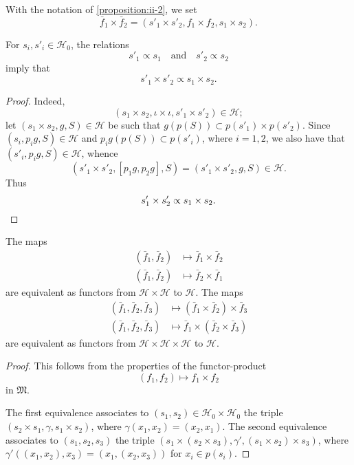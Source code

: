 \documentclass[a4paper,fleqn]{article}
\theoremstyle{plain}
\newenvironment{proposition}[1]
  {\renewcommand\theinnerproposition{#1}\innerproposition}
  {\endinnerproposition}
\theoremstyle{definition}
\newcommand{\textand}{\quad\text{and}\quad}
\newcommand{\HH}{\mathcal{H}}
\newcommand{\MM}{\mathfrak{M}}
\newcommand{\subs}{\mathrel{\propto}}
\begin{document}
With the notation of \cref{proposition:ii-2}, we set
\[
  \bar{f}_1\times\bar{f}_2
  = (s'_1\times s'_2, f_1\times f_2, s_1\times s_2).
\]

\begin{proposition}{3}
\label{proposition:ii-3}
  For $s_i,s'_i\in\HH_0$, the relations
  \[
    s'_1\subs s_1
    \textand
    s'_2\subs s_2
  \]
  imply that
  \[
    s'_1\times s'_2
    \subs s_1\times s_2.
  \]
\end{proposition}

\begin{proof}
  Indeed,
  \[
    (s_1\times s_2, \iota\times\iota, s'_1\times s'_2)
    \in\HH;
  \]
  let $(s_1\times s_2,g,S)\in\HH$ be such that $g(p(S))\subset p(s'_1)\times p(s'_2)$.
  Since $(s_i,p_ig,S)\in\HH$ and $p_ig(p(S))\subset p(s'_i)$, where $i=1,2$, we also have that $(s'_i,p_ig,S)\in\HH$, whence
  \[
    (s'_1\times s'_2, [p_1g,p_2g], S)
    = (s'_1\times s'_2,g,S)
    \in\HH.
  \]
  Thus
  \[
    s'_1\times s'_2
    \subs s_1\times s_2.
    \qedhere
  \]
\end{proof}

\begin{proposition}{4}
\label{proposition:ii-4}
  The maps
  \[
    \begin{aligned}
      (\bar{f}_1,\bar{f}_2)
      &\longmapsto \bar{f}_1\times\bar{f}_2
    \\(\bar{f}_1,\bar{f}_2)
      &\longmapsto \bar{f}_2\times\bar{f}_1
    \end{aligned}
  \]
  are equivalent as functors from $\HH\times\HH$ to $\HH$.
  The maps
  \[
    \begin{aligned}
      (\bar{f}_1,\bar{f}_2,\bar{f}_3)
      &\longmapsto (\bar{f}_1\times\bar{f}_2)\times\bar{f}_3
    \\(\bar{f}_1,\bar{f}_2,\bar{f}_3)
      &\longmapsto \bar{f}_1\times(\bar{f}_2\times\bar{f}_3)
    \end{aligned}
  \]
  are equivalent as functors from $\HH\times\HH\times\HH$ to $\HH$.
\end{proposition}

\begin{proof}
  This follows from the properties of the functor-product \cite{3d}
  \[
    (f_1,f_2)
    \longmapsto f_1\times f_2
  \]
  in $\MM$.

  The first equivalence associates to $(s_1,s_2)\in\HH_0\times\HH_0$ the triple $(s_2\times s_1,\gamma,s_1\times s_2)$, where $\gamma(x_1,x_2)=(x_2,x_1)$.
  The second equivalence associates to $(s_1,s_2,s_3)$ the triple $(s_1\times(s_2\times s_3),\gamma',(s_1\times s_2)\times s_3)$, where $\gamma'((x_1,x_2),x_3)=(x_1,(x_2,x_3))$ for $x_i\in p(s_i)$.
\end{proof}
\end{document}
